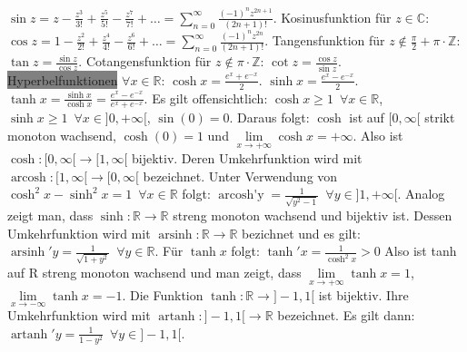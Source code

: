 \documentclass[landscape, 10pt]{article}
\newcommand{\R}{\mathbb{R}}
\newcommand{\C}{\mathbb{C}}
\begin{document}
\begin{multicols}{3}
              $\sin z=z-\frac{z^3}{3!}+\frac{z^5}{5!}-\frac{z^7}{7!}+\dots
              =\sum_{n=0}^\infty\frac{(-1)^nz^{2n+1}}{(2n+1)!}$.
              Kosinusfunktion für $z\in\C:$
              $\cos z=1-\frac{z^2}{2!}+\frac{z^4}{4!}-\frac{z^6}{6!}+\dots
              =\sum_{n=0}^\infty\frac{(-1)^nz^{2n}}{(2n+1)!}$.
              Tangensfunktion für $z\notin\frac{\pi}{2}+\pi\cdot\mathbb{Z}$:
              $\tan z=\frac{\sin z}{\cos z}$. \quad
              Cotangensfunktion für $z\notin\pi\cdot\mathbb{Z}$:
              $\cot z=\frac{\cos z}{\sin z}$.\\
       \colorbox{gray}{Hyperbelfunktionen} $\forall x\in\R$:\quad
              $\cosh x=\frac{e^x+e^{-x}}{2}$.\quad
              $\sinh x=\frac{e^x-e^{-x}}{2}$.\quad
              $\tanh x=\frac{\sinh x}{\cosh x}=\frac{e^x-e^{-x}}{e^x+e^{-x}}$.
              Es gilt offensichtlich:
              $\cosh x\geqslant1\enspace\forall x\in\R$,
              $\sinh x\geqslant1\enspace\forall x\in]0,+\infty[$,
              $\sin(0)=0$. Daraus folgt: $\cosh$ ist 
              auf $[0,\infty[$ strikt
              monoton wachsend, $\cosh(0)=1$ und
              $\lim\limits_{x\to+\infty}\cosh x=+\infty$. Also ist
              $\cosh:[0,\infty[\longrightarrow[1,\infty[$ 
              bijektiv. Deren Umkehrfunktion wird mit 
              $\operatorname{arcosh}:[1,\infty[\longrightarrow[0,\infty[$ 
              bezeichnet. Unter Verwendung von
              $\cosh^2x-\sinh^2x=1\enspace\forall x\in\R$ 
              folgt:
              $\operatorname{arcosh'y}
              =\frac{1}{\sqrt{y^2-1}}\enspace\forall y\in]1,+\infty[$.
              Analog zeigt man, dass 
              $\sinh:\R\longrightarrow\R$ streng monoton
              wachsend und bijektiv ist. Dessen Umkehrfunktion 
              wird mit 
              $\operatorname{arsinh}:\R\longrightarrow\R$ 
              bezichnet und es gilt:
              $\operatorname{arsinh}'y
              =\frac{1}{\sqrt{1+y^2}}\enspace\forall y\in\R$. 
              Für $\tanh x$ folgt:
              $\tanh'x=\frac{1}{\cosh^2x}>0$ Also ist tanh auf R streng
              monoton wachsend und man zeigt, dass 
              $\lim\limits_{x\to+\infty}\tanh x=1$,
              $\lim\limits_{x\to-\infty}\tanh x=-1$.
              Die Funktion $\tanh:\R\longrightarrow]-1,1[$ ist
              bijektiv. Ihre Umkehrfunktion 
              wird mit 
              $\operatorname{artanh}:]-1,1[\longrightarrow\R$
              bezeichnet. Es gilt dann:
              $\operatorname{artanh}'y=\frac{1}{1-y^2}\enspace
              \forall y\in]-1,1[$. 



\end{multicols}
\end{document}
